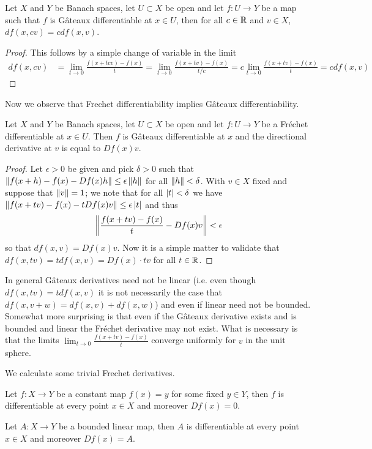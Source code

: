 \begin{prop}\label{GateauxDerivativeHomogeneous}Let $X$ and $Y$ be
  Banach spaces, let $U \subset X$ be open and let $f : U \to Y$ be
  a map such that $f$ is G\^{a}teaux differentiable at $x \in U$, then
  for all $c \in \mathbb{R}$ and $v \in X$, $df(x,cv) = cdf(x,v)$.
\end{prop}
\begin{proof}
This follows by a simple change of variable in the limit
\begin{align*}
df(x,cv) &= \lim_{t \to  0} \frac{f(x + t c v) - f(x)}{t} = \lim_{t \to  0} \frac{f(x + t v) - f(x)}{t/c} = c \lim_{t \to  0} \frac{f(x + t v) - f(x)}{t} = c df(x,v)
\end{align*} 
\end{proof}


Now we observe that Frechet differentiability implies G\^{a}teaux differentiability.
\begin{prop}\label{FrechetDifferentiableImpliesGateauxDifferentiable}Let $X$ and $Y$ be Banach spaces, let $U \subset X$ be
  open and let $f : U \to Y$ be
  a Fr\'{e}chet differentiable at $x \in U$.  Then $f$ is G\^{a}teaux
  differentiable at $x$ and the directional derivative at $v$ is equal
  to $Df(x)v$.
\end{prop}
\begin{proof}
Let $\epsilon >0$ be given and pick $\delta>0$ such
that $\left \lVert f(x+h) - f(x) -Df(x)h \right \rVert \leq \epsilon \left \lVert h \right \rVert$ for all
$\left \lVert h \right \rVert < \delta$.  With $v \in X$ fixed and suppose that $\left \lVert v \right \rVert
= 1$; we note that for all
$\left \vert t \right \vert < \delta$ we have $\left \lVert f(x+tv) - f(x) - t Df(x) v \right \rVert
\leq \epsilon \left \vert t \right \vert $ and thus 
\begin{align*}
\left \lVert \frac{f(x+tv) - f(x) }{t} - Df(x) v \right \rVert < \epsilon
\end{align*}
so that $df(x,v) = Df(x) v$.  Now it is a simple matter to validate
that $df(x, tv) = t df(x,v) = Df(x) \cdot tv$ for all $t \in \mathbb{R}$.
\end{proof}
In general G\^{a}teaux derivatives need not be linear (i.e. even
though $df(x,tv) = tdf(x,v)$ it is not necessarily the case that
$df(x,v+w) = df(x,v) + df(x,w)$) and even if
linear need not be bounded.  Somewhat more surprising is that even if
the G\^{a}teaux derivative exists and is bounded and linear the
Fr\'{e}chet derivative may not exist.  What is necessary is that the
limits $\lim_{t \to 0} \frac{f(x+tv) -f(x)}{t}$ converge uniformly for
$v$ in the unit sphere.

We calculate some trivial Frechet derivatives.
\begin{examp}Let $f : X \to Y$ be a constant map $f(x) = y$ for some
  fixed $y \in Y$, then $f$ is differentiable at every point $x \in X$
  and moreover $Df(x) = 0$.
\end{examp}
\begin{examp}Let $A : X \to Y$ be a bounded linear map, then $A$ is differentiable at every point $x \in X$
  and moreover $Df(x) = A$.
\end{examp}

